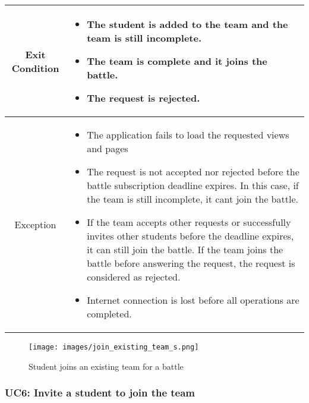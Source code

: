 \documentclass[a4paper, 11pt, titlepage]{article}
\begin{document}
\begin{center}
\begin{tabularx}{\linewidth} {|c|X|}
        \hline 
        Exit Condition &
        \begin{itemize}
            \item The student is added to the team and the team is still incomplete.
            \item The team is complete and it joins the battle.
            \item The request is rejected. 
        \end{itemize}
        \\
        \hline 
        Exception & 
        \begin{itemize}
            \item The application fails to load the requested views and pages
            \item The request is not accepted nor rejected before the battle subscription deadline expires. In this case, if the team is still incomplete, it cant join the battle.
            \item If the team accepts other requests or successfully invites other students before the deadline expires, it can still join the battle. If the team joins the battle before answering the request, the request is considered as rejected.
            \item Internet connection is lost before all operations are completed.
        \end{itemize}\\
        \hline
    \end{tabularx}
\end{center}

\begin{figure}[h!]
    \centering
    \texttt{[image: images/join\_existing\_team\_s.png]}
    \caption{Student joins an existing team for a battle}
    \label{fig:seq_diag_join_team}
    
\end{figure}

\clearpage

\subsubsection*{UC6: Invite a student to join the team}
\end{document}
